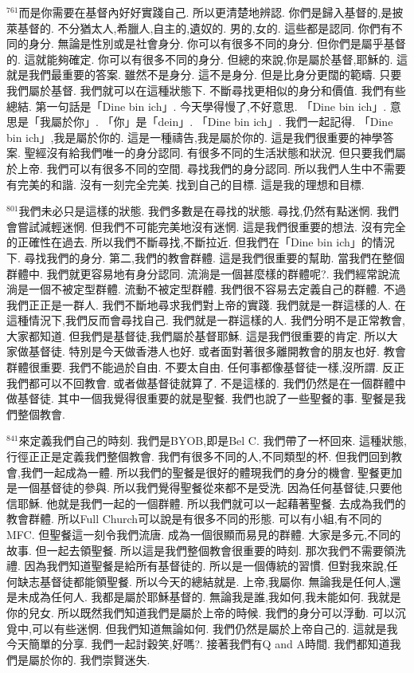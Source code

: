 \documentclass{book}
\begin{document}
$^{761}$而是你需要在基督內好好實踐自己.
所以更清楚地辨認.
你們是歸入基督的,是披萊基督的.
不分猶太人,希臘人,自主的,遺奴的.
男的,女的.
這些都是認同.
你們有不同的身分.
無論是性別或是社會身分.
你可以有很多不同的身分.
但你們是屬乎基督的.
這就能夠確定.
你可以有很多不同的身分.
但總的來說,你是屬於基督,耶穌的.
這就是我們最重要的答案.
雖然不是身分.
這不是身分.
但是比身分更闊的範疇.
只要我們屬於基督.
我們就可以在這種狀態下.
不斷尋找更相似的身分和價值.
我們有些總結.
第一句話是「Dine bin ich」.
今天學得慢了,不好意思.
「Dine bin ich」.
意思是「我屬於你」.
「你」是「dein」.
「Dine bin ich」.
我們一起記得.
「Dine bin ich」,我是屬於你的.
這是一種禱告,我是屬於你的.
這是我們很重要的神學答案.
聖經沒有給我們唯一的身分認同.
有很多不同的生活狀態和狀況.
但只要我們屬於上帝.
我們可以有很多不同的空間.
尋找我們的身分認同.
所以我們人生中不需要有完美的和諧.
沒有一刻完全完美.
找到自己的目標.
這是我的理想和目標.

$^{801}$我們未必只是這樣的狀態.
我們多數是在尋找的狀態.
尋找,仍然有點迷惘.
我們會嘗試減輕迷惘.
但我們不可能完美地沒有迷惘.
這是我們很重要的想法.
沒有完全的正確性在過去.
所以我們不斷尋找,不斷拉近.
但我們在「Dine bin ich」的情況下.
尋找我們的身分.
第二,我們的教會群體.
這是我們很重要的幫助.
當我們在整個群體中.
我們就更容易地有身分認同.
流淌是一個甚麼樣的群體呢?.
我們經常說流淌是一個不被定型群體.
流動不被定型群體.
我們很不容易去定義自己的群體.
不過我們正正是一群人.
我們不斷地尋求我們對上帝的實踐.
我們就是一群這樣的人.
在這種情況下,我們反而會尋找自己.
我們就是一群這樣的人.
我們分明不是正常教會,大家都知道.
但我們是基督徒,我們屬於基督耶穌.
這是我們很重要的肯定.
所以大家做基督徒.
特別是今天做香港人也好.
或者面對著很多離開教會的朋友也好.
教會群體很重要.
我們不能過於自由.
不要太自由.
任何事都像基督徒一樣,沒所謂.
反正我們都可以不回教會.
或者做基督徒就算了.
不是這樣的.
我們仍然是在一個群體中做基督徒.
其中一個我覺得很重要的就是聖餐.
我們也說了一些聖餐的事.
聖餐是我們整個教會.

$^{841}$來定義我們自己的時刻.
我們是BYOB,即是Bel C.
我們帶了一杯回來.
這種狀態,行徑正正是定義我們整個教會.
我們有很多不同的人,不同類型的杯.
但我們回到教會,我們一起成為一體.
所以我們的聖餐是很好的體現我們的身分的機會.
聖餐更加是一個基督徒的參與.
所以我們覺得聖餐從來都不是受洗.
因為任何基督徒,只要他信耶穌.
他就是我們一起的一個群體.
所以我們就可以一起藉著聖餐.
去成為我們的教會群體.
所以Full Church可以說是有很多不同的形態.
可以有小組,有不同的MFC.
但聖餐這一刻令我們流唐.
成為一個很顯而易見的群體.
大家是多元,不同的故事.
但一起去領聖餐.
所以這是我們整個教會很重要的時刻.
那次我們不需要領洗禮.
因為我們知道聖餐是給所有基督徒的.
所以是一個傳統的習慣.
但對我來說,任何缺志基督徒都能領聖餐.
所以今天的總結就是.
上帝,我屬你.
無論我是任何人,還是未成為任何人.
我都是屬於耶穌基督的.
無論我是誰,我如何,我未能如何.
我就是你的兒女.
所以既然我們知道我們是屬於上帝的時候.
我們的身分可以浮動.
可以沉覓中,可以有些迷惘.
但我們知道無論如何.
我們仍然是屬於上帝自己的.
這就是我今天簡單的分享.
我們一起討穀笑,好嗎?.
接著我們有Q and A時間.
我們都知道我們是屬於你的.
我們崇賢迷失.
\end{document}
